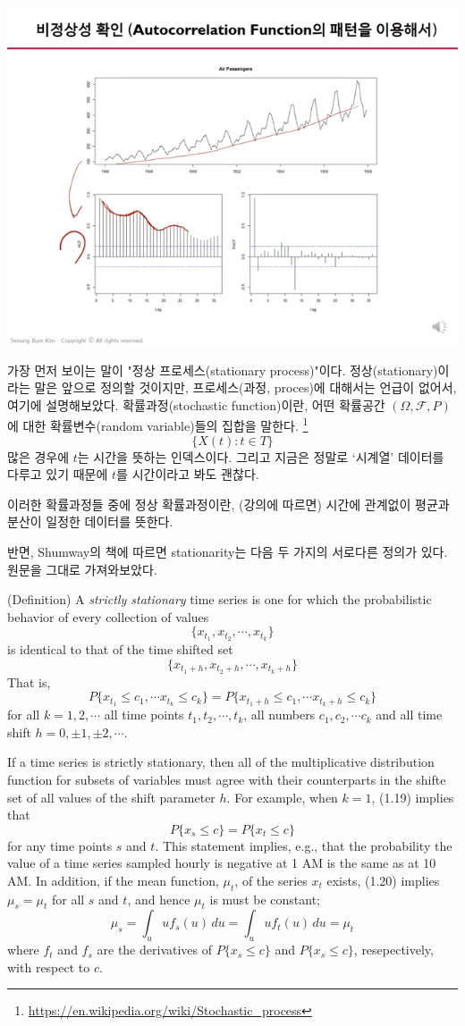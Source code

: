 \documentclass{article}
\begin{document}
\begin{center}
\includegraphics[width=.45\textwidth]{1stationarity_5}
\end{center}
가장 먼저 보이는 말이 "정상 프로세스(stationary process)"이다.
정상(stationary)이라는 말은 앞으로 정의할 것이지만, 프로세스(과정, proces)에 대해서는 언급이 없어서, 여기에 설명해보았다.
확률과정(stochastic function)이란, 어떤 확률공간 \((\Omega, \mathcal F, P)\)에 대한 확률변수(random variable)들의 집합을 말한다.
\footnote{\url{https://en.wikipedia.org/wiki/Stochastic_process}}
\[\{X(t):t\in T\}\]
많은 경우에 \(t\)는 시간을 뜻하는 인덱스이다.
그리고 지금은 정말로 `시계열' 데이터를 다루고 있기 때문에 \(t\)를 시간이라고 봐도 괜찮다.

이러한 확률과정들 중에 정상 확률과정이란, (강의에 따르면) 시간에 관계없이 평균과 분산이 일정한 데이터를 뜻한다.

반면, Shumway의 책에 따르면 stationarity는 다음 두 가지의 서로다른 정의가 있다.
원문을 그대로 가져와보았다.

(Definition)
A \emph{strictly stationary} time series is one for which the probabilistic behavior of every collection of values
\[\{x_{t_1},x_{t_2},\cdots,x_{t_k}\}\]
is identical to that of the time shifted set
\[\{x_{t_1+h},x_{t_2+h},\cdots,x_{t_k+h}\}\]
That is, 
\[P\{x_{t_1}\le c_1,\cdots x_{t_k}\le c_k\}=P\{x_{t_1+h}\le c_1,\cdots x_{t_k+h}\le c_k\}\tag{1.19}\]
for all \(k=1,2,\cdots\) all time points \(t_1,t_2,\cdots,t_k\), all numbers \(c_1,c_2,\cdots c_k\) and all time shift \(h=0,\pm1,\pm2,\cdots\).

If a time series is strictly stationary, then all of the multiplicative distribution function for subsets of variables must agree with their counterparts in the shifte set of all values of the shift parameter \(h\).
For example, when \(k=1\), (1.19) implies that
\[P\{x_s\le c\}=P\{x_t\le c\}\tag{1.20}\]
for any time points \(s\) and \(t\).
This statement implies, e.g., that the probability the value of a time series sampled hourly is negative at 1 AM is the same as at 10 AM.
In addition, if the mean function, \(\mu_t\), of the series \(x_t\) exists, (1.20) implies \(\mu_s=\mu_t\) for all \(s\) and \(t\), and hence \(\mu_t\) is must be constant;
\[\mu_s=\int_u uf_s(u)\,du=\int_u uf_t(u)\,du=\mu_t\]
where \(f_t\) and \(f_s\) are the derivatives of \(P\{x_s\le c\}\) and \(P\{x_s\le c\}\), resepectively, with respect to \(c\).
\end{document}
